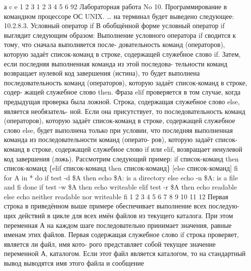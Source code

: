 \documentclass[
  letterpaper,
  DIV=11,
  numbers=noendperiod]{scrartcl}
\begin{document}
а c e 1 2 3 1 2 3 4 5 6 92 Лабораторная работа No 10. Программирование в
командном процессоре ОС UNIX. \ldots{} на терминал будет выведено
следующее: 10.2.8.3. Условный оператор if В обобщённой форме условный
оператор if выглядит следующим образом: Выполнение условного оператора
if сводится к тому, что сначала выполняется после- довательность команд
(операторов), которую задаёт список-команд в строке, содержащей
служебное слово if. Затем, если последняя выполненная команда из этой
последова- тельности команд возвращает нулевой код завершения (истина),
то будет выполнена последовательность команд (операторов), которую
задаёт список-команд в строке, содер- жащей служебное слово then. Фраза
elif проверяется в том случае, когда предыдущая проверка была ложной.
Строка, содержащая служебное слово else, является необязатель- ной. Если
она присутствует, то последовательность команд (операторов), которую
задаёт список-команд в строке, содержащей служебное слово else, будет
выполнена только при условии, что последняя выполненная команда из
последовательности команд (операто- ров), которую задаёт список-команд в
строке, содержащей служебное слово if или elif, возвращает ненулевой код
завершения (ложь). Рассмотрим следующий пример: if список-команд then
список-команд \{elif список-команд then список-команд\} {[}else
список-команд{]} fi for A in * do if test -d \$A then echo \$A: is a
directory else echo -n \$A: is a file and fi done if test -w \$A then
echo writeable elif test -r \$A then echo readable else echo neither
readable nor writeable fi 1 2 3 4 5 6 7 8 9 10 11 12 Первая строка в
приведённом выше примере обеспечивает выполнение всех последую- щих
действий в цикле для всех имён файлов из текущего каталога. При этом
переменная А на каждом шаге последовательно принимает значения, равные
именам этих файлов. Первая содержащая служебное слово if строка
проверяет, является ли файл, имя кото- рого представляет собой текущее
значение переменной А, каталогом. Если этот файл является каталогом, то
на стандартный вывод выводятся имя этого файла и сообщение
\end{document}

